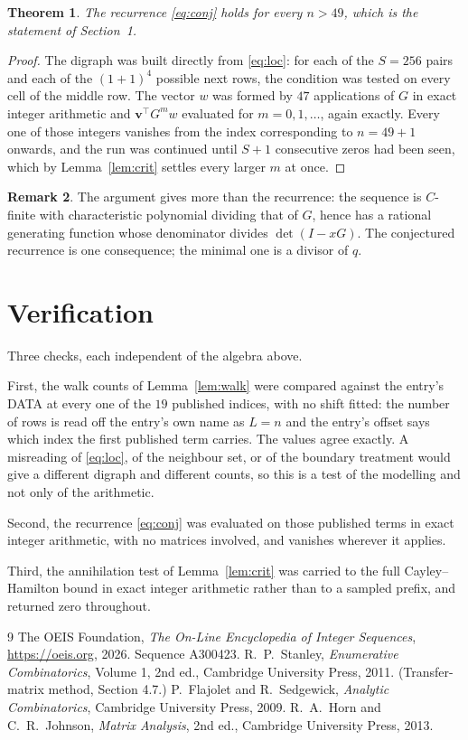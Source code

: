 \documentclass[11pt,a4paper]{article}
\theoremstyle{plain}
\newtheorem{theorem}{Theorem}
\theoremstyle{definition}
\newtheorem{remark}[theorem]{Remark}
\begin{document}
\begin{theorem}
The recurrence \eqref{eq:conj} holds for every $n>49$, which is the statement of
Section~1.
\end{theorem}

\begin{proof}
The digraph was built directly from \eqref{eq:loc}: for each of the $S=256$ pairs and each
of the $(1+1)^{4}$ possible next rows, the condition was tested on every cell of
the middle row. The vector $w$ was formed by $47$ applications of $G$ in exact integer
arithmetic and $\mathbf{v}^{\!\top}G^{m}w$ evaluated for $m=0,1,\dots$, again exactly.
Every one of those integers vanishes from the index corresponding to $n=49+1$ onwards,
and the run was continued until $S+1$ consecutive zeros had been seen, which by
Lemma~\ref{lem:crit} settles every larger $m$ at once.
\end{proof}

\begin{remark}
The argument gives more than the recurrence: the sequence is $C$-finite with characteristic
polynomial dividing that of $G$, hence has a rational generating function whose denominator
divides $\det(I-xG)$. The conjectured recurrence is one consequence; the minimal one is a
divisor of $q$.
\end{remark}

\section{Verification}

Three checks, each independent of the algebra above.

First, the walk counts of Lemma~\ref{lem:walk} were compared against the entry's DATA at
every one of the $19$ published indices, with no shift fitted: the number of rows is
read off the entry's own name as $L=n$ and the entry's offset says which index the first
published term carries. The values agree exactly. A misreading of \eqref{eq:loc}, of the
neighbour set, or of the boundary treatment would give a different digraph and different
counts, so this is a test of the modelling and not only of the arithmetic.

Second, the recurrence \eqref{eq:conj} was evaluated on those published terms in exact
integer arithmetic, with no matrices involved, and vanishes wherever it applies.

Third, the annihilation test of Lemma~\ref{lem:crit} was carried to the full
Cayley--Hamilton bound in exact integer arithmetic rather than to a sampled prefix, and
returned zero throughout.

\begin{thebibliography}{9}
 The OEIS Foundation, \emph{The On-Line Encyclopedia of Integer
Sequences}, \url{https://oeis.org}, 2026. Sequence A300423.
 R.~P.~Stanley, \emph{Enumerative Combinatorics}, Volume 1, 2nd ed.,
Cambridge University Press, 2011. (Transfer-matrix method, Section 4.7.)
 P.~Flajolet and R.~Sedgewick, \emph{Analytic Combinatorics}, Cambridge
University Press, 2009.
 R.~A.~Horn and C.~R.~Johnson, \emph{Matrix Analysis}, 2nd ed., Cambridge
University Press, 2013.
\end{thebibliography}
\end{document}
